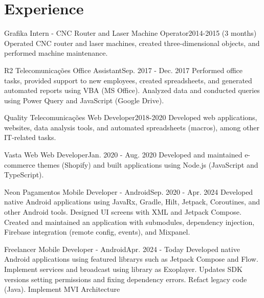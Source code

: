 \section{Experience}
  \resumeSubHeadingListStart

    \resumeSubheading
      {Grafika}{}
      {Intern - CNC Router and Laser Machine Operator}{2014-2015 (3 months)}
      \resumeItemListStart
          {Operated CNC router and laser machines, created three-dimensional objects, and performed machine maintenance.}
      \resumeItemListEnd

    \resumeSubheading
      {R2 Telecomunicações}{}
      {Office Assistant}{Sep. 2017 - Dec. 2017}
      \resumeItemListStart
          {Performed office tasks, provided support to new employees, created spreadsheets, and generated automated reports using VBA (MS Office). Analyzed data and conducted queries using Power Query and JavaScript (Google Drive).}
      \resumeItemListEnd

    \resumeSubheading
      {Quality Telecomunicações}{}
      {Web Developer}{2018-2020}
      \resumeItemListStart
          {Developed web applications, websites, data analysis tools, and automated spreadsheets (macros), among other IT-related tasks.}
      \resumeItemListEnd

    \resumeSubheading
      {Vasta Web}{}
      {Web Developer}{Jan. 2020 - Aug. 2020}
      \resumeItemListStart
          {Developed and maintained e-commerce themes (Shopify) and built applications using Node.js (JavaScript and TypeScript).}
      \resumeItemListEnd

    \resumeSubheading
      {Neon Pagamentos}{}
      {Mobile Developer - Android}{Sep. 2020 - Apr. 2024}
      \resumeItemListStart
          {Developed native Android applications using JavaRx, Gradle, Hilt, Jetpack, Coroutines, and other Android tools. Designed UI screens with XML and Jetpack Compose. Created and maintained an application with submodules, dependency injection, Firebase integration (remote config, events), and Mixpanel.}
      \resumeItemListEnd

    \resumeSubheading
      {Freelancer}{}
      {Mobile Developer - Android}{Apr. 2024 - Today}
      \resumeItemListStart
          {Developed native Android applications using featured librarys such as Jetpack Compose and Flow. Implement services and broadcast using library as Exoplayer. Updates SDK versions setting permissions and fixing dependency errors. Refact legacy code (Java). Implement MVI Architecture}
      \resumeItemListEnd

  \resumeSubHeadingListEnd
